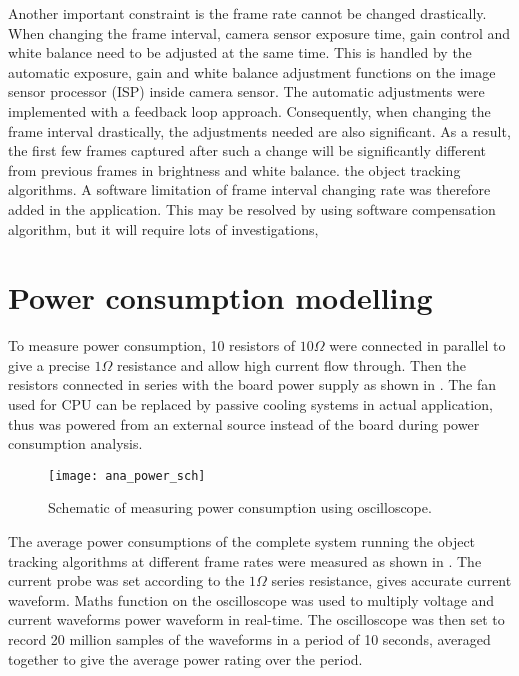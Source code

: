 Another important constraint is  the frame rate cannot be changed drastically. When changing the frame interval, camera sensor exposure time, gain control and white balance need to be adjusted at the same time. This is handled by the automatic exposure, gain and white balance adjustment functions on the image sensor processor (ISP) inside camera sensor. The automatic adjustments were implemented with a feedback loop approach. Consequently, when changing the frame interval drastically, the adjustments needed are also significant. As a result, the first few frames captured after such a change will be significantly different from previous frames in brightness and white balance.  the object tracking algorithms. A software limitation of frame interval changing rate was therefore added in the application. This may be resolved by using software compensation algorithm, but it will require lots of investigations, 




\section{Power consumption modelling}

To measure power consumption, 10 resistors of $10 \Omega$ were connected in parallel to give a precise $1 \Omega$ resistance and allow high current  flow through. Then the resistors  connected in series with the board power supply as shown in . The fan used for CPU  can be replaced by passive cooling systems in actual application, thus was powered from an external source instead of the board during power consumption analysis.

\begin{figure}[H]
  \centering
  \texttt{[image: ana\_power\_sch]}
  \caption{Schematic of measuring power consumption using oscilloscope.}
  \label{ana:power:sch}
\end{figure}

The average power consumptions of the complete system running the object tracking algorithms at different frame rates were measured as shown in . The current probe was set according to the $1 \Omega$ series resistance,  gives accurate current waveform. Maths function on the oscilloscope was used to multiply voltage and current waveforms  power waveform in real-time. The oscilloscope was then set to record 20 million samples of the waveforms in a period of 10 seconds, averaged together to give the average power rating over the period.

